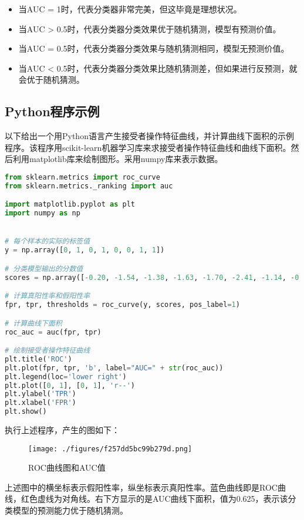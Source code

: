 \begin{itemize}
\item 当AUC = 1时，代表分类器非常完美，但这毕竟是理想状况。
\item 当AUC > 0.5时，代表分类器分类效果优于随机猜测，模型有预测价值。
\item 当AUC = 0.5时，代表分类器分类效果与随机猜测相同，模型无预测价值。
\item 当AUC < 0.5时，代表分类器分类效果比随机猜测差，但如果进行反预测，就会优于随机猜测。
\end{itemize}

\subsection{Python程序示例}
以下给出一个用Python语言产生接受者操作特征曲线，并计算曲线下面积的示例程序。该程序用scikit-learn机器学习库来求接受者操作特征曲线和曲线下面积。然后利用matplotlib库来绘制图形。采用numpy库来表示数据。
\begin{lstlisting}[language=python]
from sklearn.metrics import roc_curve
from sklearn.metrics._ranking import auc

import matplotlib.pyplot as plt
import numpy as np


# 每个样本的实际的标签值
y = np.array([0, 1, 0, 1, 0, 0, 1, 1]) 

# 分类模型输出的分数值
scores = np.array([-0.20, -1.54, -1.38, -1.63, -1.70, -2.41, -1.14, -0.79])

# 计算真阳性率和假阳性率
fpr, tpr, thresholds = roc_curve(y, scores, pos_label=1)

# 计算曲线下面积
roc_auc = auc(fpr, tpr)

# 绘制接受者操作特征曲线
plt.title('ROC')
plt.plot(fpr, tpr, 'b', label="AUC=" + str(roc_auc))
plt.legend(loc='lower right')
plt.plot([0, 1], [0, 1], 'r--')
plt.ylabel('TPR')
plt.xlabel('FPR')
plt.show()
\end{lstlisting}

执行上述程序，产生的图如下：
\begin{figure}[ht]
\centering
\texttt{[image: ./figures/f257dd5bc99b279d.png]}
\caption{ROC曲线图和AUC值} \label{fig_ROC_2}
\end{figure}
上述图中的横坐标表示假阳性率，纵坐标表示真阳性率。蓝色曲线即是ROC曲线，红色虚线为对角线。右下方显示的是AUC曲线下面积，值为0.625，表示该分类模型的预测能力优于随机猜测。